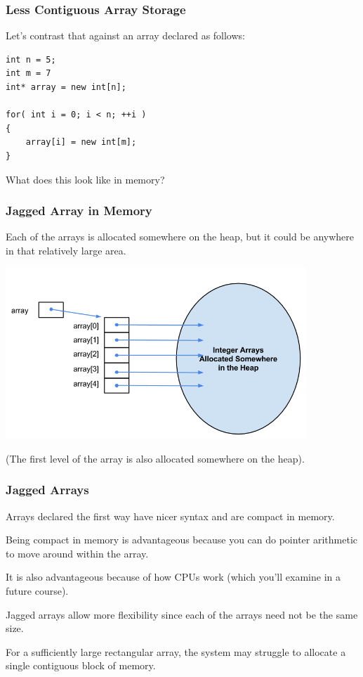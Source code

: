 \begin{frame}[fragile]
\frametitle{Less Contiguous Array Storage}
Let's contrast that against an array declared as follows:\\

\begin{verbatim}
int n = 5;
int m = 7
int* array = new int[n];

for( int i = 0; i < n; ++i )
{
    array[i] = new int[m];
}
\end{verbatim}

What does this look like in memory?

\end{frame}

\begin{frame}
\frametitle{Jagged Array in Memory}

Each of the arrays is allocated somewhere on the heap, but it could be anywhere in that relatively large area.

\begin{center}
	\includegraphics[width=0.85\textwidth]{images/jaggedArrayMemory.png}
\end{center}

(The first level of the array is also allocated somewhere on the heap).


\end{frame}

\begin{frame}
\frametitle{Jagged Arrays}

Arrays declared the first way have nicer syntax and are compact in memory.

Being compact in memory is advantageous because you can do pointer arithmetic to move around within the array.

It is also advantageous because of how CPUs work (which you'll examine in a future course).

Jagged arrays allow more flexibility since each of the arrays need not be the same size.

For a sufficiently large rectangular array, the system may struggle to allocate a single contiguous block of memory.

\end{frame}



